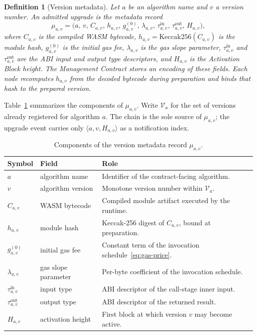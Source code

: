 \documentclass[pdflatex,sn-mathphys-num]{sn-jnl}%
\theoremstyle{thmstyleone}%
\theoremstyle{thmstyletwo}%
\theoremstyle{thmstylethree}%
\newtheorem{definition}{Definition}%
\begin{document}
\begin{definition}[Version metadata]
\label{def:version-metadata}
Let $a$ be an algorithm name and $v$ a version number. An admitted upgrade is the metadata record
\begin{equation}
\mu_{a,v}=\bigl(a,\,v,\,C_{a,v},\,h_{a,v},\,g^{(0)}_{a,v},\,\lambda_{a,v},\,\tau^{\mathrm{in}}_{a,v},\,\tau^{\mathrm{out}}_{a,v},\,H_{a,v}\bigr),
\label{eq:version-metadata}
\end{equation}
where $C_{a,v}$ is the compiled WASM bytecode, $h_{a,v}=\mathrm{Keccak256}(C_{a,v})$ is the module hash, $g^{(0)}_{a,v}$ is the initial gas fee, $\lambda_{a,v}$ is the gas slope parameter, $\tau^{\mathrm{in}}_{a,v}$ and $\tau^{\mathrm{out}}_{a,v}$ are the ABI input and output type descriptors, and $H_{a,v}$ is the Activation Block height. The Management Contract stores an encoding of these fields. Each node recomputes $h_{a,v}$ from the decoded bytecode during preparation and binds that hash to the prepared version.
\end{definition}

Table~\ref{tab:version-metadata} summarizes the components of $\mu_{a,v}$. Write $\mathcal{V}_{a}$ for the set of versions already registered for algorithm $a$. The chain is the sole source of $\mu_{a,v}$; the upgrade event carries only $\langle a,v,H_{a,v}\rangle$ as a notification index.

\begin{table}[ht]
\centering
\caption{Components of the version metadata record $\mu_{a,v}$.}\label{tab:version-metadata}
\begin{tabular}{llp{}}
\toprule
Symbol & Field & Role \\
\midrule
$a$ & algorithm name & Identifier of the contract-facing algorithm. \\
$v$ & algorithm version & Monotone version number within $\mathcal{V}_{a}$. \\
$C_{a,v}$ & WASM bytecode & Compiled module artifact executed by the runtime. \\
$h_{a,v}$ & module hash & Keccak-256 digest of $C_{a,v}$, bound at preparation. \\
$g^{(0)}_{a,v}$ & initial gas fee & Constant term of the invocation schedule~\eqref{eq:gas-price}. \\
$\lambda_{a,v}$ & gas slope parameter & Per-byte coefficient of the invocation schedule. \\
$\tau^{\mathrm{in}}_{a,v}$ & input type & ABI descriptor of the call-stage inner input. \\
$\tau^{\mathrm{out}}_{a,v}$ & output type & ABI descriptor of the returned result. \\
$H_{a,v}$ & activation height & First block at which version $v$ may become active. \\
\bottomrule
\end{tabular}
\end{table}
\end{document}
